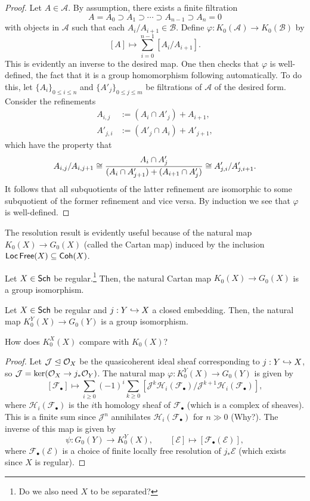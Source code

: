 \documentclass[11pt]{article}
\renewcommand{\AA}{\mathcal{A}}
\newcommand{\BB}{\mathcal{B}}
\newcommand{\EE}{\mathcal{E}}
\newcommand{\FF}{\mathcal{F}}
\newcommand{\HH}{\mathcal{H}}
\newcommand{\J}{\mathcal{J}}
\renewcommand{\phi}{\varphi}
\begin{document}
\begin{proof}
Let $A\in\AA$. By assumption, there exists a finite filtration 
$$A=A_0\supset A_1\supset\cdots\supset A_{n-1}\supset A_n=0$$
with objects in $\AA$ such that each $A_i/A_{i+1}\in\BB$. Define $\phi: K_0(\AA)\to K_0(\BB)$ by 
$$[A]\mapsto\sum_{i=0}^{n-1}[A_i/A_{i+1}].$$ 
This is evidently an inverse to the desired map. One then checks that $\phi$ is well-defined, the fact that it is a group homomorphism following automatically. To do this, let $\{A_i\}_{0\leq i\leq n}$ and $\{A'_j\}_{0\leq j\leq m}$ be filtrations of $\AA$ of the desired form. Consider the refinements
\begin{align*}
A_{i,j}&:=(A_i\cap A'_j)+A_{i+1}, \\
A'_{j,i}&:=(A'_j\cap A_i)+A'_{j+1},
\end{align*}
which have the property that 
$$A_{i,j}/A_{i,j+1}\cong\dfrac{A_i\cap A'_j}{(A_i\cap A'_{j+1})+(A_{i+1}\cap A'_j)}\cong A'_{j,i}/A'_{j,i+1}.$$
It follows that all subquotients of the latter refinement are isomorphic to some subquotient of the former refinement and vice versa. By induction we see that $\phi$ is well-defined.
\end{proof}

The resolution result is evidently useful because of the natural map $K_0(X)\to G_0(X)$ (called the Cartan map) induced by the inclusion $\operatorname{\mathsf{Loc}}\operatorname{\mathsf{Free}}(X)\subseteq\operatorname{\mathsf{Coh}}(X)$. 

\begin{theorem}
Let $X\in\operatorname{\mathsf{Sch}}$ be regular.\footnote{Do we also need $X$ to be separated?} Then, the natural Cartan map $K_0(X)\to G_0(X)$ is a group isomorphism.
\end{theorem}

\begin{theorem}
Let $X\in\operatorname{\mathsf{Sch}}$ be regular and $j: Y\hookrightarrow X$ a closed embedding. Then, the natural map $K_0^Y(X)\to G_0(Y)$ is a group isomorphism.
\end{theorem}

\begin{remark}
How does $K_0^X(X)$ compare with $K_0(X)$?
\end{remark}

\begin{proof}
Let $\J\normal\O_X$ be the quasicoherent ideal sheaf corresponding to $j: Y\hookrightarrow X$, so $\J=\ker(\O_X\to j_*\O_Y)$. The natural map $\phi: K_0^Y(X)\to G_0(Y)$ is given by 
$$[\FF_{\bullet}]\mapsto\sum_{i\geq0}(-1)^i\sum_{k\geq0}[\J^k\HH_i(\FF_{\bullet})/\J^{k+1}\HH_i(\FF_{\bullet})],$$
where $\HH_i(\FF_{\bullet})$ is the $i$th homology sheaf of $\FF_{\bullet}$ (which is a complex of sheaves). This is a finite sum since $\J^n$ annihilates $\HH_i(\FF_{\bullet})$ for $n\gg0$ (Why?). The inverse of this map is given by 
$$\psi: G_0(Y)\to K_0^Y(X),\qquad [\EE]\mapsto[\FF_{\bullet}(\EE)],$$
where $\FF_{\bullet}(\EE)$ is a choice of finite locally free resolution of $j_*\EE$ (which exists since $X$ is regular).
\end{proof}
\end{document}
